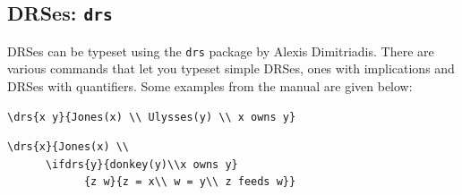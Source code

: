 \begin{samepage}
\begin{fitverb}
\end{fitverb}
\end{samepage}

\subsection{DRSes: \texttt{drs}}

DRSes can be typeset using the \texttt{drs} package by Alexis Dimitriadis. There are various commands that let you typeset simple DRSes, ones with implications
and DRSes with quantifiers. Some examples from the manual are given below:

\bigskip


\begin{verbatim}
\drs{x y}{Jones(x) \\ Ulysses(y) \\ x owns y}
\end{verbatim}



\begin{verbatim}
\drs{x}{Jones(x) \\
      \ifdrs{y}{donkey(y)\\x owns y}
            {z w}{z = x\\ w = y\\ z feeds w}}
\end{verbatim}


